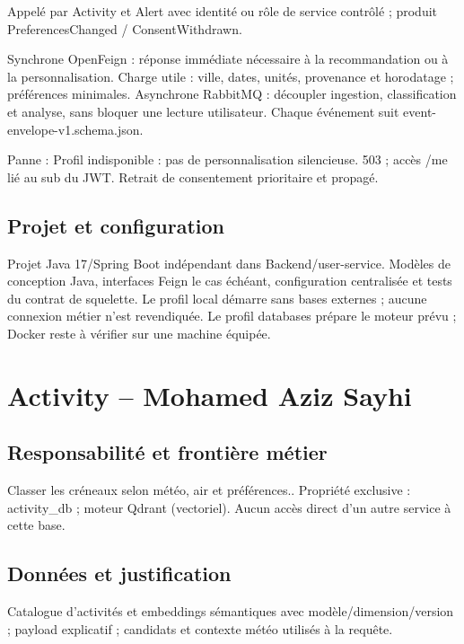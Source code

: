 \documentclass[10pt,a4paper]{article}
\begin{document}
Appelé par Activity et Alert avec identité ou rôle de service contrôlé ; produit PreferencesChanged / ConsentWithdrawn.\par

Synchrone OpenFeign : réponse immédiate nécessaire à la recommandation ou à la personnalisation. Charge utile : ville, dates, unités, provenance et horodatage ; préférences minimales. Asynchrone RabbitMQ : découpler ingestion, classification et analyse, sans bloquer une lecture utilisateur. Chaque événement suit event-envelope-v1.schema.json.\par

Panne : Profil indisponible : pas de personnalisation silencieuse. 503 ; accès /me lié au sub du JWT. Retrait de consentement prioritaire et propagé.\par

\subsection*{Projet et configuration}

Projet Java 17/Spring Boot indépendant dans Backend/user-service. Modèles de conception Java, interfaces Feign le cas échéant, configuration centralisée et tests du contrat de squelette. Le profil local démarre sans bases externes ; aucune connexion métier n'est revendiquée. Le profil databases prépare le moteur prévu ; Docker reste à vérifier sur une machine équipée.\par
\clearpage
\section*{Activity  --  Mohamed Aziz Sayhi}

\subsection*{Responsabilité et frontière métier}

Classer les créneaux selon météo, air et préférences.. Propriété exclusive : activity\_db ; moteur Qdrant (vectoriel). Aucun accès direct d'un autre service à cette base.\par

\subsection*{Données et justification}

Catalogue d'activités et embeddings sémantiques avec modèle/dimension/version ; payload explicatif ; candidats et contexte météo utilisés à la requête.\par
\end{document}
